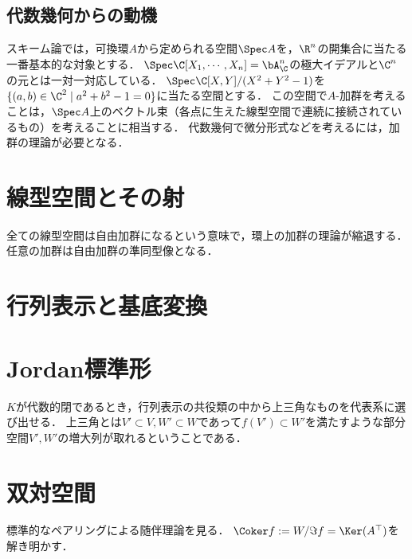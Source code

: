 \documentclass[uplatex,dvipdfmx]{jsreport}
\begin{document}
\subsection{代数幾何からの動機}

スキーム論では，可換環$A$から定められる空間$\Spec A$を，$\R^n$の開集合に当たる一番基本的な対象とする．
$\Spec\C[X_1,\cdots,X_n]=\bA_\C^n$の極大イデアルと$\C^n$の元とは一対一対応している．
$\Spec\C[X,Y]/(X^2+Y^2-1)$を$\{(a,b)\in\C^2\mid a^2+b^2-1=0\}$に当たる空間とする．
この空間で$A$-加群を考えることは，$\Spec A$上のベクトル束（各点に生えた線型空間で連続に接続されているもの）を考えることに相当する．
代数幾何で微分形式などを考えるには，加群の理論が必要となる．


\section{線型空間とその射}

\begin{tcolorbox}[colframe=ForestGreen, colback=ForestGreen!10!white,breakable,colbacktitle=ForestGreen!40!white,coltitle=black,fonttitle=\bfseries\sffamily,
title=]
    全ての線型空間は自由加群になるという意味で，環上の加群の理論が縮退する．
    任意の加群は自由加群の準同型像となる．
\end{tcolorbox}

\section{行列表示と基底変換}

\section{Jordan標準形}

\begin{tcolorbox}[colframe=ForestGreen, colback=ForestGreen!10!white,breakable,colbacktitle=ForestGreen!40!white,coltitle=black,fonttitle=\bfseries\sffamily,
title=]
    $K$が代数的閉であるとき，行列表示の共役類の中から上三角なものを代表系に選び出せる．
    上三角とは$V'\subset V,W'\subset W$であって$f(V')\subset W'$を満たすような部分空間$V',W'$の増大列が取れるということである．
\end{tcolorbox}

\section{双対空間}

\begin{tcolorbox}[colframe=ForestGreen, colback=ForestGreen!10!white,breakable,colbacktitle=ForestGreen!40!white,coltitle=black,fonttitle=\bfseries\sffamily,
title=]
    標準的なペアリングによる随伴理論を見る．
    $\Coker f:=W/\Im f=\Ker(A^\top)$を解き明かす．
\end{tcolorbox}
\end{document}
